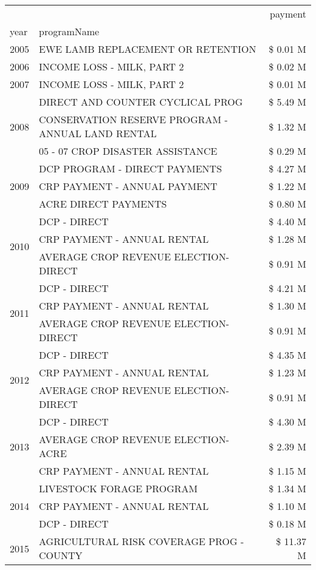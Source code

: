 \begin{tabular}{llr}
\toprule
 &  & payment \\
year & programName &  \\
\midrule
2005 & EWE LAMB REPLACEMENT OR RETENTION & \$ 0.01 M \\
\cline{1-3}
2006 & INCOME LOSS - MILK, PART 2 & \$ 0.02 M \\
\cline{1-3}
2007 & INCOME LOSS - MILK, PART 2 & \$ 0.01 M \\
\cline{1-3}
\multirow[t]{3}{*}{2008} & DIRECT AND COUNTER CYCLICAL PROG & \$ 5.49 M \\
 & CONSERVATION RESERVE PROGRAM - ANNUAL LAND RENTAL & \$ 1.32 M \\
 & 05 - 07 CROP DISASTER ASSISTANCE & \$ 0.29 M \\
\cline{1-3}
\multirow[t]{3}{*}{2009} & DCP PROGRAM - DIRECT PAYMENTS & \$ 4.27 M \\
 & CRP PAYMENT - ANNUAL PAYMENT & \$ 1.22 M \\
 & ACRE DIRECT PAYMENTS & \$ 0.80 M \\
\cline{1-3}
\multirow[t]{3}{*}{2010} & DCP - DIRECT & \$ 4.40 M \\
 & CRP PAYMENT - ANNUAL RENTAL & \$ 1.28 M \\
 & AVERAGE CROP REVENUE ELECTION-DIRECT & \$ 0.91 M \\
\cline{1-3}
\multirow[t]{3}{*}{2011} & DCP - DIRECT & \$ 4.21 M \\
 & CRP PAYMENT - ANNUAL RENTAL & \$ 1.30 M \\
 & AVERAGE CROP REVENUE ELECTION-DIRECT & \$ 0.91 M \\
\cline{1-3}
\multirow[t]{3}{*}{2012} & DCP - DIRECT & \$ 4.35 M \\
 & CRP PAYMENT - ANNUAL RENTAL & \$ 1.23 M \\
 & AVERAGE CROP REVENUE ELECTION-DIRECT & \$ 0.91 M \\
\cline{1-3}
\multirow[t]{3}{*}{2013} & DCP - DIRECT & \$ 4.30 M \\
 & AVERAGE CROP REVENUE ELECTION-ACRE & \$ 2.39 M \\
 & CRP PAYMENT - ANNUAL RENTAL & \$ 1.15 M \\
\cline{1-3}
\multirow[t]{3}{*}{2014} & LIVESTOCK FORAGE PROGRAM & \$ 1.34 M \\
 & CRP PAYMENT - ANNUAL RENTAL & \$ 1.10 M \\
 & DCP - DIRECT & \$ 0.18 M \\
\cline{1-3}
\multirow[t]{3}{*}{2015} & AGRICULTURAL RISK COVERAGE PROG - COUNTY & \$ 11.37 M \\

\end{tabular}
